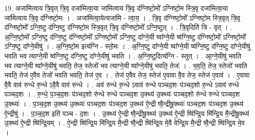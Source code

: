 \documentclass[17pt]{extarticle}
\begin{document}
19. अजा॑मित्वाय त्रि॒वृत् त्रि॒वृ दजा॑मित्वा॒या जा॑मित्वाय त्रि॒वृ द॑ग्निष्टो॒मो᳚ ऽग्निष्टो॒म स्त्रि॒वृ दजा॑मित्वा॒या जा॑मित्वाय त्रि॒वृ द॑ग्निष्टो॒मः । . अजा॑मित्वा॒येत्यजा॑मि - त्वा॒य॒ । . त्रि॒वृ द॑ग्निष्टो॒मो᳚ ऽग्निष्टो॒म स्त्रि॒वृत् त्रि॒वृ द॑ग्निष्टो॒मो᳚ ऽग्नि॒ष्टु द॑ग्नि॒ष्टु द॑ग्निष्टो॒म स्त्रि॒वृत् त्रि॒वृ द॑ग्निष्टो॒मो᳚ ऽग्नि॒ष्टुत् । . त्रि॒वृदिति॑ त्रि - वृत् । . अ॒ग्नि॒ष्टो॒मो᳚ ऽग्नि॒ष्टु द॑ग्नि॒ष्टु द॑ग्निष्टो॒मो᳚ ऽग्निष्टो॒मो᳚ ऽग्नि॒ष्टु दा᳚ग्ने॒यी ष्वा᳚ग्ने॒यी ष्व॑ग्नि॒ष्टु द॑ग्निष्टो॒मो᳚ ऽग्निष्टो॒मो᳚ ऽग्नि॒ष्टु दा᳚ग्ने॒यीषु॑ । . अ॒ग्नि॒ष्टो॒म इत्य॑ग्नि - स्तो॒मः । . अ॒ग्नि॒ष्टु दा᳚ग्ने॒यी ष्वा᳚ग्ने॒यी ष्व॑ग्नि॒ष्टु द॑ग्नि॒ष्टु दा᳚ग्ने॒यीषु॑ भवति भव त्याग्ने॒यी ष्व॑ग्नि॒ष्टु द॑ग्नि॒ष्टु दा᳚ग्ने॒यीषु॑ भवति । . अ॒ग्नि॒ष्टुदित्य॑ग्नि - स्तुत् । . आ॒ग्ने॒यीषु॑ भवति भव त्याग्ने॒यी ष्वा᳚ग्ने॒यीषु॑ भवति॒ तेज॒ स्तेजो॑ भव त्याग्ने॒यी ष्वा᳚ग्ने॒यीषु॑ भवति॒ तेजः॑ । . भ॒व॒ति॒ तेज॒ स्तेजो॑ भवति भवति॒ तेज॑ ए॒वैव तेजो॑ भवति भवति॒ तेज॑ ए॒व । . तेज॑ ए॒वैव तेज॒ स्तेज॑ ए॒वावा वै॒व तेज॒ स्तेज॑ ए॒वाव॑ । . ए॒वावा वै॒वै वाव॑ रुन्धे रु॒न्धे ऽवै॒वै वाव॑ रुन्धे । . अव॑ रुन्धे रु॒न्धे ऽवाव॑ रुन्धे पञ्चद॒शः प॑ञ्चद॒शो रु॒न्धे ऽवाव॑ रुन्धे पञ्चद॒शः । . रु॒न्धे॒ प॒ञ्च॒द॒शः प॑ञ्चद॒शो रु॑न्धे रुन्धे पञ्चद॒श उ॒क्थ्य॑ उ॒क्थ्यः॑ पञ्चद॒शो रु॑न्धे रुन्धे पञ्चद॒श उ॒क्थ्यः॑ । . प॒ञ्च॒द॒श उ॒क्थ्य॑ उ॒क्थ्यः॑ पञ्चद॒शः प॑ञ्चद॒श उ॒क्थ्य॑ ऐ॒न्द्री ष्वै॒न्द्रीषू॒क्थ्यः॑ पञ्चद॒शः प॑ञ्चद॒श उ॒क्थ्य॑ ऐ॒न्द्रीषु॑ । . प॒ञ्च॒द॒श इति॑ पञ्च - द॒शः । . उ॒क्थ्य॑ ऐ॒न्द्री ष्वै॒न्द्रीषू॒क्थ्य॑ उ॒क्थ्य॑ ऐ॒न्द्री ष्वि॑न्द्रि॒य मि॑न्द्रि॒य मै॒न्द्रीषू॒क्थ्य॑ उ॒क्थ्य॑ ऐ॒न्द्री 
ष्वि॑न्द्रि॒यम् । . ऐ॒न्द्री ष्वि॑न्द्रि॒य मि॑न्द्रि॒य मै॒न्द्री ष्वै॒न्द्री ष्वि॑न्द्रि॒य मे॒वै वेन्द्रि॒य मै॒न्द्री ष्वै॒न्द्री ष्वि॑न्द्रि॒य मे॒व । \newline
\end{document}
